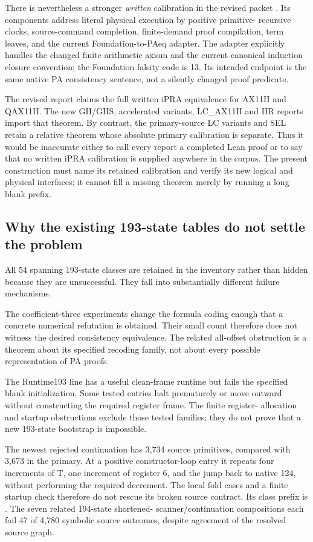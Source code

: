 There is nevertheless a stronger \emph{written} calibration in the revised
packet .
Its components address literal physical execution by positive primitive-
recursive clocks, source-command completion, finite-demand proof compilation,
term leaves, and the current Foundation-to-PAeq adapter. The adapter explicitly
handles the changed finite arithmetic axiom and the current canonical
induction closure convention; the Foundation falsity code is 13. Its intended
endpoint is the same native PA consistency sentence, not a silently changed
proof predicate.

The revised report claims the full written iPRA equivalence for AX11H and
QAX11H. The new GH/GHS, accelerated variants, LC\_AX11H and HR reports import
that theorem. By contrast, the primary-source LC variants and SEL retain a
relative theorem whose absolute primary calibration is separate. Thus it
would be inaccurate either to call every report a completed Lean proof or to
say that no written iPRA calibration is supplied anywhere in the corpus.
The present construction must name its retained calibration and verify its
new logical and physical interfaces; it cannot fill a missing theorem merely
by running a long blank prefix.

\subsection{Why the existing 193-state tables do not settle the problem}

All 54 spanning 193-state classes are retained in the inventory rather than
hidden because they are unsuccessful. They fall into substantially different
failure mechanisms.

The coefficient-three experiments change the formula coding enough that a
concrete numerical refutation is obtained. Their small count therefore does
not witness the desired consistency equivalence. The related all-offset
obstruction is a theorem about its specified recoding family, not about every
possible representation of PA proofs.

The Runtime193 line has a useful clean-frame runtime but fails the specified
blank initialization. Some tested entries halt prematurely or move outward
without constructing the required register frame. The finite register-
allocation and startup obstructions exclude those tested families; they do
not prove that a new 193-state bootstrap is impossible.

The newest rejected continuation has 3,734 source primitives, compared with
3,673 in the primary. At a positive constructor-loop entry it repeats four
increments of T, one increment of register 6, and the jump back to native
124, without performing the required decrement. The local fold cases and a
finite startup check therefore do not rescue its broken source contract.
Its class prefix is . The seven related 194-state shortened-
scanner/continuation compositions each fail 47 of 4,780 symbolic source
outcomes, despite agreement of the resolved source graph.


